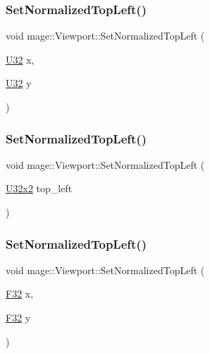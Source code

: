 \subsubsection{\texorpdfstring{Set\+Normalized\+Top\+Left()}{SetNormalizedTopLeft()}\hspace{0.1cm}{\footnotesize\ttfamily [1/4]}}
{\footnotesize\ttfamily void mage\+::\+Viewport\+::\+Set\+Normalized\+Top\+Left (\begin{DoxyParamCaption}\item[{\hyperlink{namespacemage_a41c104c036fba3756a74e19f793eeaa1}{U32}}]{x,  }\item[{\hyperlink{namespacemage_a41c104c036fba3756a74e19f793eeaa1}{U32}}]{y }\end{DoxyParamCaption})\hspace{0.3cm}{\ttfamily [noexcept]}}

\hypertarget{classmage_1_1_viewport_a56a14e677fdc0ecd2ee5e6568e27a633}{}\label{classmage_1_1_viewport_a56a14e677fdc0ecd2ee5e6568e27a633} 
\subsubsection{\texorpdfstring{Set\+Normalized\+Top\+Left()}{SetNormalizedTopLeft()}\hspace{0.1cm}{\footnotesize\ttfamily [2/4]}}
{\footnotesize\ttfamily void mage\+::\+Viewport\+::\+Set\+Normalized\+Top\+Left (\begin{DoxyParamCaption}\item[{\hyperlink{namespacemage_a88e05bff0300120c013285d3dcad95c5}{U32x2}}]{top\+\_\+left }\end{DoxyParamCaption})\hspace{0.3cm}{\ttfamily [noexcept]}}

\hypertarget{classmage_1_1_viewport_a6f85757d3b7e09e9e7cb72c201fd0cd4}{}\label{classmage_1_1_viewport_a6f85757d3b7e09e9e7cb72c201fd0cd4} 
\subsubsection{\texorpdfstring{Set\+Normalized\+Top\+Left()}{SetNormalizedTopLeft()}\hspace{0.1cm}{\footnotesize\ttfamily [3/4]}}
{\footnotesize\ttfamily void mage\+::\+Viewport\+::\+Set\+Normalized\+Top\+Left (\begin{DoxyParamCaption}\item[{\hyperlink{namespacemage_aa97e833b45f06d60a0a9c4fc22ae02c0}{F32}}]{x,  }\item[{\hyperlink{namespacemage_aa97e833b45f06d60a0a9c4fc22ae02c0}{F32}}]{y }\end{DoxyParamCaption})\hspace{0.3cm}{\ttfamily [noexcept]}}

